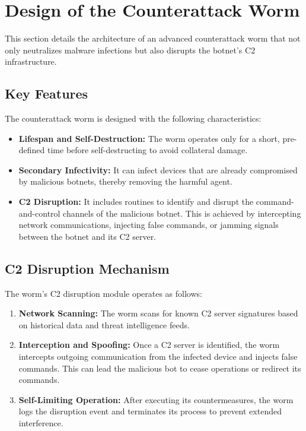 \documentclass{article}
\begin{document}
\section{Design of the Counterattack Worm}
\noindent
This section details the architecture of an advanced counterattack worm that not only neutralizes malware infections but also disrupts the botnet’s C2 infrastructure.

\subsection{Key Features}
The counterattack worm is designed with the following characteristics:
\begin{itemize}
    \item \textbf{Lifespan and Self-Destruction:} The worm operates only for a short, pre-defined time before self-destructing to avoid collateral damage.
    \item \textbf{Secondary Infectivity:} It can infect devices that are already compromised by malicious botnets, thereby removing the harmful agent.
    \item \textbf{C2 Disruption:} It includes routines to identify and disrupt the command-and-control channels of the malicious botnet. This is achieved by intercepting network communications, injecting false commands, or jamming signals between the botnet and its C2 server.
\end{itemize}

\subsection{C2 Disruption Mechanism}
The worm's C2 disruption module operates as follows:
\begin{enumerate}
    \item \textbf{Network Scanning:} The worm scans for known C2 server signatures based on historical data and threat intelligence feeds.
    \item \textbf{Interception and Spoofing:} Once a C2 server is identified, the worm intercepts outgoing communication from the infected device and injects false commands. This can lead the malicious bot to cease operations or redirect its commands.
    \item \textbf{Self-Limiting Operation:} After executing its countermeasures, the worm logs the disruption event and terminates its process to prevent extended interference.
\end{enumerate}
\end{document}
